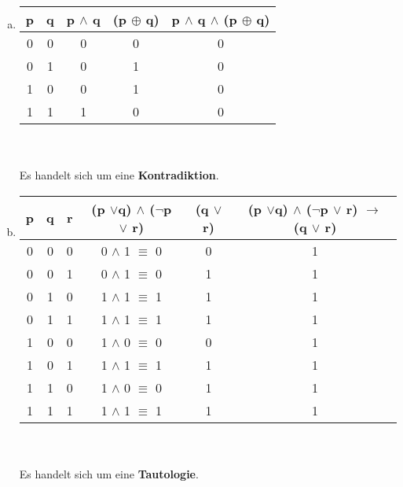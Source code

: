 \documentclass[12pt,a4paper]{article}
\begin{document}
\begin{enumerate}[a)]
\item 
\begin{tabular}{c|c|c|c|c}
p & q & p $\land$ q & (p $\oplus$	q) & p $\land$ q $\land$ (p $\oplus$ q) \\
\hline
0 & 0 & 0 & 0 & 0\\
0 & 1  & 0 & 1 & 0\\
1 & 0 & 0& 1 & 0\\
1 & 1 & 1 & 0 & 0\\
\end{tabular}\\
\\
Es handelt sich um eine \textbf{Kontradiktion}.

\item 
\begin{tabular}{c|c|c|c|c|c}
p & q & r & (p $\lor$q) $\land$ ($\neg$p $\lor$ r) & (q $\lor$ r) & (p $\lor$q) $\land$ ($\neg$p $\lor$ r) $\rightarrow$  (q $\lor$ r)\\
\hline
0 & 0 & 0 & 0 $\land$ 1 $\equiv$ 0 & 0 & 1\\
0 & 0 & 1 & 0 $\land$ 1 $\equiv$ 0 & 1 & 1\\
0 & 1 & 0 & 1 $\land$ 1 $\equiv$ 1 & 1 & 1\\
0 & 1 & 1 & 1 $\land$ 1 $\equiv$ 1 & 1 & 1\\
1 & 0 & 0 & 1 $\land$ 0 $\equiv$ 0 & 0 & 1\\
1 & 0 & 1 & 1 $\land$ 1 $\equiv$ 1 & 1 & 1\\
1 & 1 & 0 & 1 $\land$ 0 $\equiv$ 0 & 1 & 1\\
1 & 1 & 1 & 1 $\land$ 1 $\equiv$ 1 & 1 & 1\\
\end{tabular}\\
\\
Es handelt sich um eine \textbf{Tautologie}.


\end{enumerate}
\end{document}
